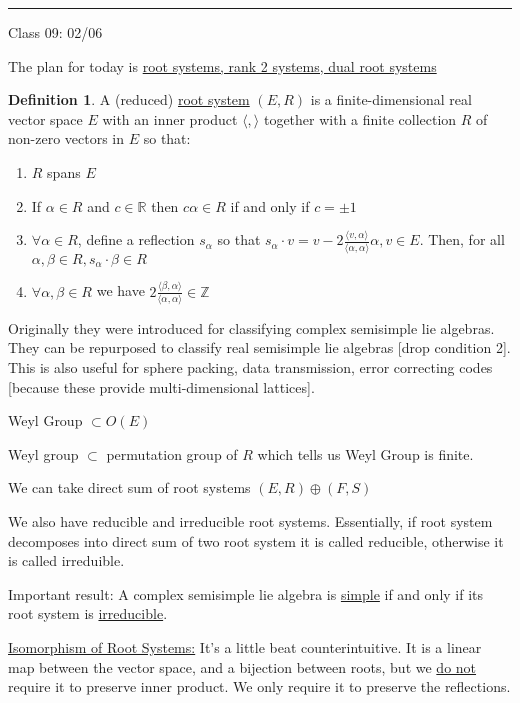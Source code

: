 \documentclass{article}
\theoremstyle{definition}
\newtheorem{definition}{Definition}
\begin{document}
\hfil
\hrule

Class 09: 02/06

The plan for today is \underline{root systems, rank 2 systems, dual root systems}

\begin{definition}
    A (reduced) \underline{root system} \((E,R)\) is a finite-dimensional real vector space \(E\) with an inner product \(\langle , \rangle \) together with a finite collection \(R\) of non-zero vectors in \(E\) so that:

    \begin{enumerate}
        \item \(R\) spans \(E\) 
        \item If \(\alpha \in R\) and \(c\in\mathbb{R}\) then \(c \alpha \in R\) if and only if \(c=\pm 1\) 
        \item \(\forall \alpha \in R\), define a reflection \(s_\alpha \) so that \(s_\alpha \cdot v = v - 2 \frac{\langle v,\alpha \rangle }{\langle \alpha ,\alpha  \rangle }\alpha ,v\in E\). Then, for all \(\alpha ,\beta \in R,s_\alpha \cdot \beta \in R\) 
        \item \(\forall \alpha ,\beta \in R\) we have \(2 \frac{\langle \beta ,\alpha  \rangle }{\langle \alpha ,\alpha  \rangle }\in\mathbb{Z}\)  
    \end{enumerate}

\end{definition}

Originally they were introduced for classifying complex semisimple lie algebras. They can be repurposed to classify real semisimple lie algebras [drop condition 2]. This is also useful for sphere packing, data transmission, error correcting codes [because these provide multi-dimensional lattices].

Weyl Group \(\subset O(E)\) 

Weyl group \(\subset\) permutation group of \(R\) which tells us Weyl Group is finite.

We can take direct sum of root systems \((E,R)\oplus (F,S)\) 

We also have reducible and irreducible root systems. Essentially, if root system decomposes into direct sum of two root system it is called reducible, otherwise it is called irreduible.

Important result: A complex semisimple lie algebra is \underline{simple} if and only if its root system is \underline{irreducible}.

\underline{Isomorphism of Root Systems:} It's a little beat counterintuitive. It is a linear map between the vector space, and a bijection between roots, but we \underline{do not} require it to preserve inner product. We only require it to preserve the reflections.
\end{document}
